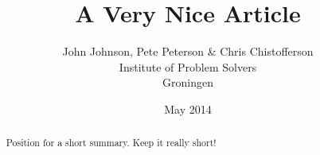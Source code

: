 \documentclass[11pt,a4paper]{report}
\title{A Very Nice Article}
\author{John Johnson, Pete Peterson \& Chris Chistofferson\\
Institute of Problem Solvers\\
Groningen}
\date{May 2014}
\begin{document}
\maketitle

\begin{abstract}
Position for a short summary.
Keep it really short!
\end{abstract}

\tableofcontents


\end{document}
